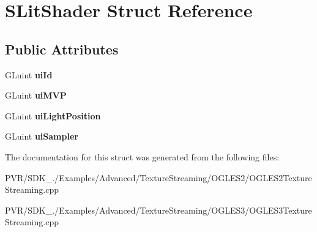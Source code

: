 \hypertarget{struct_s_lit_shader}{\section{S\+Lit\+Shader Struct Reference}
\label{struct_s_lit_shader}
}
\subsection*{Public Attributes}
\begin{DoxyCompactItemize}
\item 
\hypertarget{struct_s_lit_shader_a631a3717d6956691b72bad77855fa3b9}{G\+Luint {\bfseries ui\+Id}}\label{struct_s_lit_shader_a631a3717d6956691b72bad77855fa3b9}

\item 
\hypertarget{struct_s_lit_shader_a035d61667d1e62c44c0e53c7d9e779b1}{G\+Luint {\bfseries ui\+M\+V\+P}}\label{struct_s_lit_shader_a035d61667d1e62c44c0e53c7d9e779b1}

\item 
\hypertarget{struct_s_lit_shader_a9f188cbf5f47dbfecdbf79e32e05c82e}{G\+Luint {\bfseries ui\+Light\+Position}}\label{struct_s_lit_shader_a9f188cbf5f47dbfecdbf79e32e05c82e}

\item 
\hypertarget{struct_s_lit_shader_abda1e3b49fab62354e8cde2b5e041711}{G\+Luint {\bfseries ui\+Sampler}}\label{struct_s_lit_shader_abda1e3b49fab62354e8cde2b5e041711}

\end{DoxyCompactItemize}


The documentation for this struct was generated from the following files\+:\begin{DoxyCompactItemize}
\item 
P\+V\+R/\+S\+D\+K\+\_./\+Examples/\+Advanced/\+Texture\+Streaming/\+O\+G\+L\+E\+S2/O\+G\+L\+E\+S2\+Texture\+Streaming.\+cpp\item 
P\+V\+R/\+S\+D\+K\+\_./\+Examples/\+Advanced/\+Texture\+Streaming/\+O\+G\+L\+E\+S3/O\+G\+L\+E\+S3\+Texture\+Streaming.\+cpp\end{DoxyCompactItemize}
